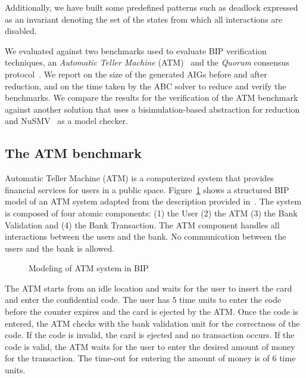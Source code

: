 Additionally, we have built some predefined patterns such as deadlock expressed as an invariant denoting the set of the states from which all interactions are disabled. 



We evaluated \biptool{} against two benchmarks used to evaluate BIP verification techniques, 
an {\em Automatic Teller Machine} (ATM)~\cite{atm} and the {\em Quorum} consensus
protocol~\cite{guerraoui2012speculative}. We report on the size of the generated
AIGs before and after reduction, and on the time taken by the ABC solver to 
reduce and verify the benchmarks. We compare the results for the 
verification of the ATM benchmark against another solution that uses a bisimulation-based abstraction for reduction \cite{facs14} and NuSMV~\cite{nusmv} as a model checker. 
%
\subsection{The ATM benchmark}
\label{subsec:atm}
%
Automatic Teller Machine (ATM) is a computerized system that provides financial services for users in 
a public space. Figure~\ref{fig:atm_bip} shows a structured BIP model of an ATM system adapted from the
description provided in~\cite{atm}.
The system is composed of four atomic components: (1) the User (2) the ATM (3) the Bank Validation 
and (4) the Bank Transaction.
The ATM component handles all interactions between the 
users and the bank. No communication between the users and the bank is allowed. 

\begin{figure}
 \centering
  \resizebox{1.0\textwidth}{!}{
       
  }
  \caption{Modeling of ATM system in BIP} 
  \label{fig:atm_bip}
\end{figure}

The ATM starts from an idle location and waits for the user to insert the card 
and enter the confidential code. The user has $5$ time units
to enter the code before the counter expires and the card is ejected by the ATM. 
Once the code is entered, the ATM checks with the bank validation unit for 
the correctness of the code. If the code is invalid, the card is ejected
and no transaction occurs. If the code is valid, the ATM waits for the user to enter
the desired amount of money for the transaction. The time-out for entering the amount 
of money is of $6$ time units. 

